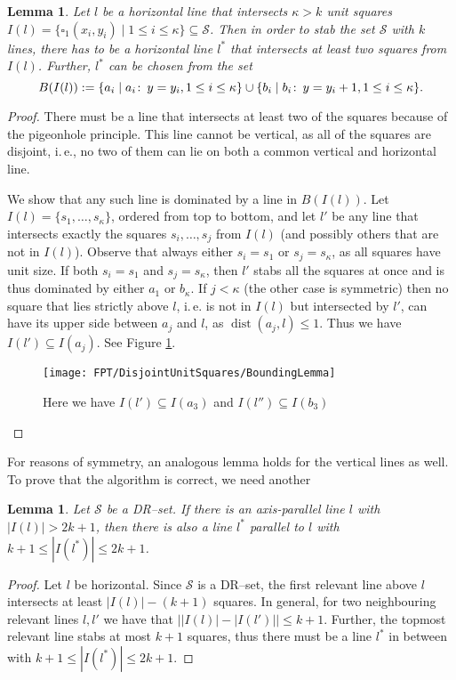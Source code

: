 \documentclass[12pt]{article}
\newtheorem{lemma}[definition]{Lemma}
\newcommand{\co}{\colon\thinspace}
\newcommand{\dist}{\operatorname{dist}}
\begin{document}
\begin{lemma}\label{Lemma:BoundingLemma} 
  Let $l$ be a horizontal line that intersects $\kappa > k$ unit squares
  $I(l) = \{ \square_1(x_i, y_i) \mid 1 \leq i \leq \kappa \} \subseteq \mathcal
  S$. Then in order to stab the set $\mathcal S$ with $k$ lines, there
  has to be a horizontal line $l^*$ that intersects at least two squares
  from $I(l)$. Further, $l^*$ can be chosen from the set
  \[ B(I(l)) := \{ a_i \mid a_i\co y = y_i, 1 \leq i \leq \kappa \}
  \cup \{ b_i \mid b_i\co y = y_i + 1, 1 \leq i \leq \kappa \}. \]
\end{lemma}
\begin{proof}
There must be a line that intersects at least two of the squares because of the pigeonhole principle. This line cannot be vertical, as all of the squares are disjoint, i.\,e., no two of them can lie on both a common vertical and horizontal line.

We show that any such line is dominated by a line in $B(I(l))$. Let $I(l) = \{s_1, \dots, s_\kappa \}$, ordered from top to bottom, and let $l'$ be any line that intersects exactly the squares $s_i,\dots, s_j$ from $I(l)$ (and possibly others that are not in $I(l)$). Observe that always either $s_i = s_1$ or $s_j = s_\kappa$, as all squares have unit size. If both $s_i = s_1$ and $s_j = s_\kappa$, then $l'$ stabs all the squares at once and is thus dominated by either $a_1$ or $b_\kappa$. If $j < \kappa$ (the other case is symmetric) then no square that lies strictly above $l$, i.\,e. is not in $I(l)$ but intersected by $l'$, can have its upper side between $a_j$ and $l$, as $\dist(a_j, l) \leq 1$. Thus we have $I(l') \subseteq I(a_j)$. See Figure \ref{fig:BoundingLemma}.
\begin{figure}
	\centering
		\texttt{[image: FPT/DisjointUnitSquares/BoundingLemma]}
	\caption{Here we have $I(l') \subseteq I(a_3)$ and $I(l'') \subseteq I(b_3)$}
	\label{fig:BoundingLemma}
\end{figure}
\end{proof}
For reasons of symmetry, an analogous lemma holds for the vertical lines as well. To prove that the algorithm is correct, we need another

\begin{lemma}\label{Lemma:IntermediateLemma} Let $\mathcal S$ be a DR--set. If there is an axis-parallel line $l$ with $|I(l)| > 2k + 1$, then there is also a line $l^*$ parallel to $l$ with $k+1 \leq |I(l^*)| \leq 2k+1$.
\end{lemma}
\begin{proof} Let $l$ be horizontal. Since $\mathcal S$ is a DR--set, the
  first relevant line above $l$ intersects at least $|I(l)| - (k + 1)$
  squares. In general, for two neighbouring relevant lines $l, l'$ we have that $\left||I(l)| - |I(l')|\right| \leq k + 1$. Further, the topmost relevant line stabs at most $k + 1$ squares,
  thus there must be a line $l^ *$ in between with $k+1 \leq |I(l^*)| \leq
  2k+1$. 
\end{proof}
\end{document}
